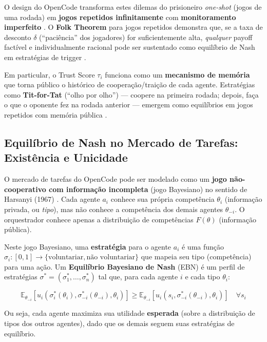 O design do OpenCode transforma estes dilemas do prisioneiro \textit{one-shot} (jogos de uma rodada) em \textbf{jogos repetidos infinitamente} com \textbf{monitoramento imperfeito} \cite{fudenberg1986folk}. O \textbf{Folk Theorem} para jogos repetidos demonstra que, se a taxa de desconto $\delta$ (``paciência'' dos jogadores) for suficientemente alta, \textit{qualquer} payoff factível e individualmente racional pode ser sustentado como equilíbrio de Nash em estratégias de trigger \cite{fudenberg1986folk, rubinstein1979equilibrium}.

Em particular, o Trust Score $\tau_i$ funciona como um \textbf{mecanismo de memória} que torna público o histórico de cooperação/traição de cada agente. Estratégias como \textbf{Tit-for-Tat} (``olho por olho'') --- coopere na primeira rodada; depois, faça o que o oponente fez na rodada anterior --- emergem como equilíbrios em jogos repetidos com memória pública \cite{axelrod1984evolution}.

\subsection{Equilíbrio de Nash no Mercado de Tarefas: Existência e Unicidade}

O mercado de tarefas do OpenCode pode ser modelado como um \textbf{jogo não-cooperativo com informação incompleta} (jogo Bayesiano) no sentido de Harsanyi (1967) \cite{harsanyi1967games}. Cada agente $a_i$ conhece sua própria competência $\theta_i$ (informação privada, ou \textit{tipo}), mas não conhece a competência dos demais agentes $\theta_{-i}$. O orquestrador conhece apenas a distribuição de competências $F(\theta)$ (informação pública).

Neste jogo Bayesiano, uma \textbf{estratégia} para o agente $a_i$ é uma função $\sigma_i: [0,1] \to \{\text{voluntariar}, \text{não voluntariar}\}$ que mapeia seu tipo (competência) para uma ação. Um \textbf{Equilíbrio Bayesiano de Nash} (EBN) é um perfil de estratégias $\sigma^* = (\sigma_1^*, \ldots, \sigma_n^*)$ tal que, para cada agente $i$ e cada tipo $\theta_i$:

\begin{equation}\label{eq:bayesian_nash}
\mathbb{E}_{\theta_{-i}}[u_i(\sigma_i^*(\theta_i), \sigma_{-i}^*(\theta_{-i}), \theta_i)] \geq \mathbb{E}_{\theta_{-i}}[u_i(s_i, \sigma_{-i}^*(\theta_{-i}), \theta_i)] \quad \forall s_i
\end{equation}

Ou seja, cada agente maximiza sua utilidade \textbf{esperada} (sobre a distribuição de tipos dos outros agentes), dado que os demais seguem suas estratégias de equilíbrio.

